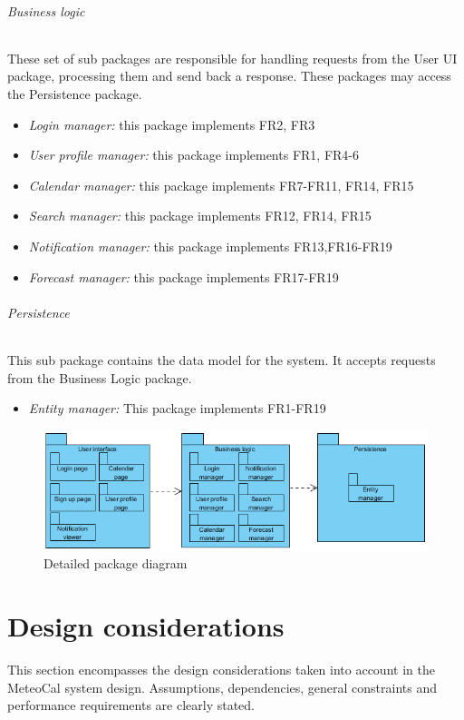 \documentclass[10pt,a4paper,titlepage]{article}
\begin{document}
\paragraph{Business logic}
These set of sub packages are responsible for handling requests from the User UI package, processing them and send back a response. These packages may access the Persistence package.
\begin{itemize}
\item \emph{Login manager:} this package implements FR2, FR3
\item \emph{User profile manager:} this package implements FR1, FR4-6
\item \emph{Calendar manager:} this package implements FR7-FR11, FR14, FR15
\item \emph{Search manager:} this package implements FR12, FR14, FR15
\item \emph{Notification manager:} this package implements FR13,FR16-FR19
\item \emph{Forecast manager:} this package implements FR17-FR19
\end{itemize}

\paragraph{Persistence}
This sub package contains the data model for the system. It accepts requests from the Business Logic package.
\begin{itemize}
\item \emph{Entity manager:} This package implements FR1-FR19
\end{itemize}

\begin{figure}[h!]
\centering
\includegraphics[width=\linewidth]{./images/detailed-package}
\caption[Detailed package]{Detailed package diagram}
\label{fig:detailed-package}
\end{figure}

\clearpage
\part{Design considerations}
\label{part:design-considerations}
This section encompasses the design considerations taken into account in the MeteoCal system design. Assumptions, dependencies, general constraints and performance requirements are clearly stated.
\end{document}
